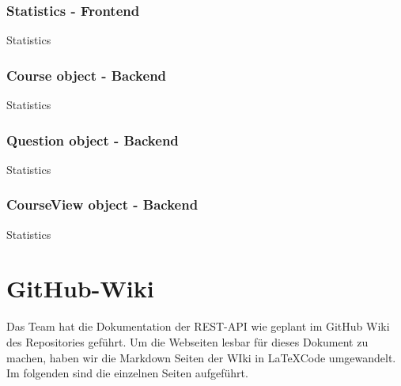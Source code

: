\documentclass[accentcolor=tud0b,12pt,paper=a4]{tudreport}
\begin{document}


\subsection*{Statistics - Frontend}
Statistics 



\subsection*{Course object - Backend}
Statistics 



\subsection*{Question object - Backend}
Statistics 



\subsection*{CourseView object - Backend}
Statistics 




\chapter{GitHub-Wiki}
Das Team hat die Dokumentation der REST-API wie geplant im GitHub Wiki des Repositories geführt. Um die Webseiten lesbar für dieses Dokument zu machen, haben wir die Markdown Seiten der WIki in \LaTeX Code umgewandelt. Im folgenden sind die einzelnen Seiten aufgeführt.













	
\end{document}
